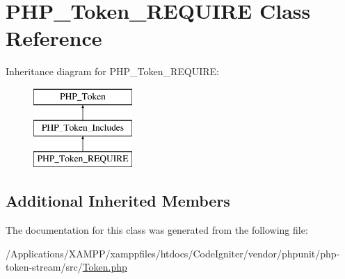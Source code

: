 \hypertarget{class_p_h_p___token___r_e_q_u_i_r_e}{}\section{P\+H\+P\+\_\+\+Token\+\_\+\+R\+E\+Q\+U\+I\+RE Class Reference}
\label{class_p_h_p___token___r_e_q_u_i_r_e}
Inheritance diagram for P\+H\+P\+\_\+\+Token\+\_\+\+R\+E\+Q\+U\+I\+RE\+:\begin{figure}[H]
\begin{center}
\leavevmode
\includegraphics[height=3.000000cm]{class_p_h_p___token___r_e_q_u_i_r_e}
\end{center}
\end{figure}
\subsection*{Additional Inherited Members}


The documentation for this class was generated from the following file\+:\begin{DoxyCompactItemize}
\item 
/\+Applications/\+X\+A\+M\+P\+P/xamppfiles/htdocs/\+Code\+Igniter/vendor/phpunit/php-\/token-\/stream/src/\mbox{\hyperlink{_token_8php}{Token.\+php}}\end{DoxyCompactItemize}
